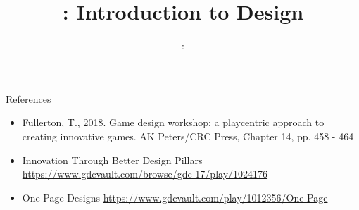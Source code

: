 \usepackage{../../beamerthemeFalmouthGamesAcademy}
\usepackage{multimedia}
\graphicspath{ {../../} }


\usepackage[normalem]{ulem}
\usepackage{wasysym}
\usepackage{graphicx} %

\usepackage{pdfpages}

\usetikzlibrary{arrows,automata}





\title{\sessionnumber: Introduction to Design}
\subtitle{\modulecode: \moduletitle}

\frame{\titlepage} 




\begin{frame}{References}
	\begin{itemize}
		\item Fullerton, T., 2018. Game design workshop: a playcentric approach to creating innovative games. AK Peters/CRC Press, Chapter 14, pp. 458 - 464
		\item Innovation Through Better Design Pillars \url{https://www.gdcvault.com/browse/gdc-17/play/1024176}
		\item One-Page Designs \url{https://www.gdcvault.com/play/1012356/One-Page}
	\end{itemize}
\end{frame}


